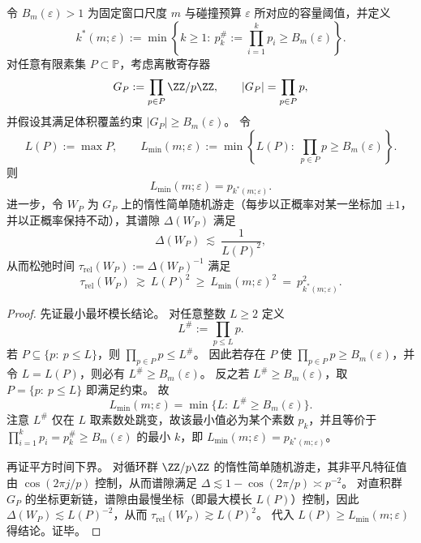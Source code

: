 \begin{theorem}\label{thm:conclusion-prime-register-worst-modulus-mixing-lower-bound}
令 \(B_m(\varepsilon)>1\) 为固定窗口尺度 \(m\) 与碰撞预算 \(\varepsilon\) 所对应的容量阈值，并定义
\[
k^\ast(m;\varepsilon):=\min\left\{k\ge 1:\ p_k^\#:=\prod_{i=1}^k p_i\ge B_m(\varepsilon)\right\}.
\]
对任意有限素集 \(P\subset\mathbb P\)，考虑离散寄存器
\[
G_P:=\prod_{p\in P}\ZZ/p\ZZ,
\qquad
|G_P|=\prod_{p\in P}p,
\]
并假设其满足体积覆盖约束 \(|G_P|\ge B_m(\varepsilon)\)。
令
\[
L(P):=\max P,
\qquad
L_{\min}(m;\varepsilon):=\min\left\{L(P):\ \prod_{p\in P}p\ge B_m(\varepsilon)\right\}.
\]
则
\[
L_{\min}(m;\varepsilon)=p_{k^\ast(m;\varepsilon)}.
\]
进一步，令 \(W_P\) 为 \(G_P\) 上的惰性简单随机游走（每步以正概率对某一坐标加 \(\pm1\)，并以正概率保持不动），其谱隙 \(\Delta(W_P)\) 满足
\[
\Delta(W_P)\ \lesssim\ \frac{1}{L(P)^2},
\]
从而松弛时间 \(\tau_{\mathrm{rel}}(W_P):=\Delta(W_P)^{-1}\) 满足
\[
\tau_{\mathrm{rel}}(W_P)\ \gtrsim\ L(P)^2\ \ge\ L_{\min}(m;\varepsilon)^2\ =\ p_{k^\ast(m;\varepsilon)}^2.
\]
\end{theorem}

\begin{proof}
先证最小最坏模长结论。
对任意整数 \(L\ge 2\) 定义
\[
L^\#:=\prod_{p\le L}p.
\]
若 \(P\subseteq\{p:\ p\le L\}\)，则 \(\prod_{p\in P}p\le L^\#\)。
因此若存在 \(P\) 使 \(\prod_{p\in P}p\ge B_m(\varepsilon)\)，并令 \(L=L(P)\)，则必有 \(L^\#\ge B_m(\varepsilon)\)。
反之若 \(L^\#\ge B_m(\varepsilon)\)，取 \(P=\{p:\ p\le L\}\) 即满足约束。
故
\[
L_{\min}(m;\varepsilon)=\min\{L:\ L^\#\ge B_m(\varepsilon)\}.
\]
注意 \(L^\#\) 仅在 \(L\) 取素数处跳变，故该最小值必为某个素数 \(p_k\)，并且等价于
\(
\prod_{i=1}^k p_i=p_k^\#\ge B_m(\varepsilon)
\) 的最小 \(k\)，即 \(L_{\min}(m;\varepsilon)=p_{k^\ast(m;\varepsilon)}\)。

再证平方时间下界。
对循环群 \(\ZZ/p\ZZ\) 的惰性简单随机游走，其非平凡特征值由 \(\cos(2\pi j/p)\) 控制，从而谱隙满足
\(
\Delta\lesssim 1-\cos(2\pi/p)\asymp p^{-2}
\)。
对直积群 \(G_P\) 的坐标更新链，谱隙由最慢坐标（即最大模长 \(L(P)\)）控制，因此
\(
\Delta(W_P)\lesssim L(P)^{-2}
\)，从而 \(\tau_{\mathrm{rel}}(W_P)\gtrsim L(P)^2\)。
代入 \(L(P)\ge L_{\min}(m;\varepsilon)\) 得结论。证毕。
\end{proof}

\endinput
